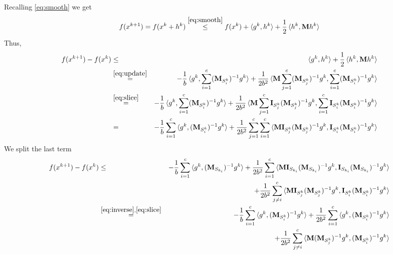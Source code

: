 \documentclass[11pt]{article}
\begin{document}
Recalling \eqref{eq:smooth} we get
		\begin{align}
			f(x^{k+1}) = f(x^k+h^k) \stackrel{\eqref{eq:smooth}} \leq f(x^k) + \braket{g^k,h^k} + \frac{1}{2}\braket{h^k,\mathbf{M}h^k}
		\end{align}
		Thus,
		\begin{eqnarray}
			f(x^{k+1})-f(x^k)  & \leq &  \braket{g^k,h^k} + \frac{1}{2}\braket{h^k,\mathbf{M}h^k} \\
			&\stackrel{\eqref{eq:update}}  =  &  -\frac{1}{b}\braket{g^k,\sum_{i=1}^{c}(\mathbf{M}_{S^k_i})^{-1} g^k} + \frac{1}{2b^2}\braket{\mathbf{M}\sum_{j=1}^{c}(\mathbf{M}_{S^k_j})^{-1} g^k,\sum_{i=1}^{c}(\mathbf{M}_{S^k_i})^{-1} g^k}  \\
			&\stackrel{\eqref{eq:slice}}  =  &  -\frac{1}{b}\braket{g^k,\sum_{i=1}^{c}(\mathbf{M}_{S^k_i})^{-1} g^k} + \frac{1}{2b^2}\braket{\mathbf{M}\sum_{j=1}^{c}\mathbf{I}_{S^k_j}(\mathbf{M}_{S^k_j})^{-1} g^k,\sum_{i=1}^{c}\mathbf{I}_{S^k_i}(\mathbf{M}_{S^k_i})^{-1} g^k} \notag  \\
			& = &  -\frac{1}{b}\sum_{i=1}^{c}\braket{g^k,(\mathbf{M}_{S^k_i})^{-1} g^k} + \frac{1}{2b^2}\sum_{j=1}^{c}\sum_{i=1}^{c}\braket{\mathbf{M}\mathbf{I}_{S^k_j}(\mathbf{M}_{S^k_j})^{-1} g^k,\mathbf{I}_{S^k_i}(\mathbf{M}_{S^k_i})^{-1} g^k}  \notag
		\end{eqnarray}
		We split the last term
		\begin{eqnarray}
			f(x^{k+1})-f(x^k)  & \leq & -\frac{1}{b}\sum_{i=1}^{c}\braket{g^k,(\mathbf{M}_{S_{k_i}})^{-1} g^k} + \frac{1}{2b^2}\sum_{i=1}^{c}\braket{\mathbf{M}\mathbf{I}_{S_{k_i}}(\mathbf{M}_{S_{k_i}})^{-1}g^k,\mathbf{I}_{S_{k_i}}(\mathbf{M}_{S_{k_i}})^{-1} g^k} \notag\\
			&& + \frac{1}{2b^2}\sum_{j\neq i}^{c}\braket{\mathbf{M}\mathbf{I}_{S^k_j}(\mathbf{M}_{S^k_j})^{-1}g^k,\mathbf{I}_{S^k_i}(\mathbf{M}_{S^k_i})^{-1} g^k}\notag\\
			& \stackrel{\eqref{eq:inverse},\eqref{eq:slice}}  = & -\frac{1}{b}\sum_{i=1}^{c}\braket{g^k,(\mathbf{M}_{S^k_i})^{-1} g^k} + \frac{1}{2b^2}\sum_{i=1}^{c}\braket{g^k,(\mathbf{M}_{S^k_i})^{-1} g^k} \\
			&& + \frac{1}{2b^2}\sum_{j\neq i}^{c}\braket{\mathbf{M}(\mathbf{M}_{S^k_j})^{-1}g^k,(\mathbf{M}_{S^k_i})^{-1} g^k}
		\end{eqnarray}
\end{document}
